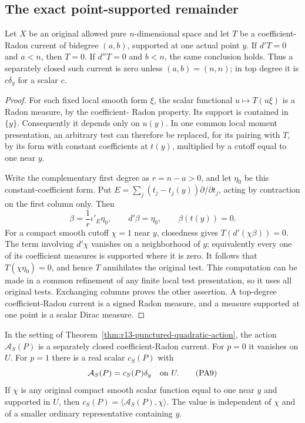 \subsection{The exact point-supported remainder}

\begin{lemma}
\label{lem:r13-point-supported-order-zero}
Let $X$ be an original allowed pure $n$-dimensional space and
let $T$ be a coefficient-Radon current of bidegree $(a,b)$,
supported at one actual point $y$.  If $d'T=0$ and $a<n$,
then $T=0$.  If $d''T=0$ and $b<n$, the same conclusion
holds.  Thus a separately closed such current is zero unless
$(a,b)=(n,n)$; in top degree it is $c\delta_y$ for a scalar
$c$.
\end{lemma}

\begin{proof}
For each fixed local smooth form $\xi$, the scalar functional
$u\mapsto T(u\xi)$ is a Radon measure, by the coefficient-
Radon property.  Its support is contained in $\{y\}$.
Consequently it depends only on $u(y)$.  In one common local
moment presentation, an arbitrary test can therefore be
replaced, for its pairing with $T$, by its form with constant
coefficients at $t(y)$, multiplied by a cutoff equal to one
near $y$.

Write the complementary first degree as $r=n-a>0$, and let
$\eta_0$ be this constant-coefficient form.  Put
$E=\sum_j(t_j-t_j(y))\partial/\partial t_j$, acting by
contraction on the first column only.  Then
\[
          \beta=\frac1r\iota'_E\eta_0,
                  \qquad d'\beta=\eta_0,
                  \qquad \beta(t(y))=0.
 \tag{PA8}
\]
For a compact smooth cutoff $\chi=1$ near $y$, closedness
gives $T(d'(\chi\beta))=0$.  The term involving $d'\chi$
vanishes on a neighborhood of $y$; equivalently every one of
its coefficient measures is supported where it is zero.
It follows that $T(\chi\eta_0)=0$, and hence $T$ annihilates
the original test.  This computation can be made in a common
refinement of any finite local test presentation, so it uses
all original tests.  Exchanging columns proves the other
assertion.  A top-degree coefficient-Radon current is a
signed Radon measure, and a measure supported at one point
is a scalar Dirac measure.
\end{proof}

\begin{proposition}
\label{prop:r13-quadratic-point-residual}
In the setting of Theorem~\ref{thm:r13-punctured-quadratic-action},
the action $\mathcal A_S(P)$ is a separately closed
coefficient-Radon current.  For $p=0$ it vanishes on $U$.
For $p=1$ there is a real scalar $c_S(P)$ with
\[
                       \mathcal A_S(P)=c_S(P)\delta_y
                              \quad\hbox{on }U.
 \tag{PA9}
\]
If $\chi$ is any original compact smooth scalar function equal
to one near $y$ and supported in $U$, then
$c_S(P)=\langle\mathcal A_S(P),\chi\rangle$.
The value is independent of $\chi$ and of a smaller ordinary
representative containing $y$.
\end{proposition}

